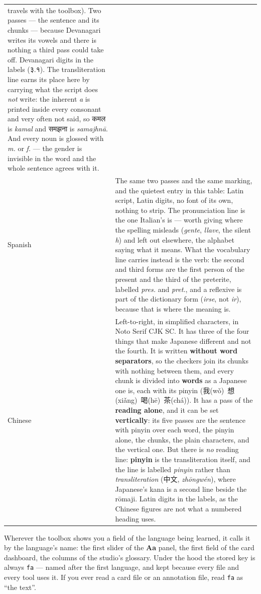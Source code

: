 \documentclass[11pt,oneside]{report}
\newcommand{\sw}[1]{\foreignlanguage{spanish}{\emph{#1}}}
\newcommand{\hw}[1]{\mbox{\foreignlanguage{hindi}{#1}}}
\newcommand{\cw}[1]{\mbox{\foreignlanguage{chinese}{#1}}}
\begin{document}
\begin{center}
\begin{longtable}{@{}p{}p{}@{}}
  travels with the toolbox). Two passes --- the sentence and its chunks ---
  because Devanagari writes its vowels and there is nothing a third pass
  could take off. Devanagari digits in the labels (\hw{३.१}). The
  transliteration line earns its place here by carrying what the script does
  \emph{not} write: the inherent \emph{a} is printed inside every consonant
  and very often not said, so \hw{कमल} is \emph{kamal} and \hw{समझना} is
  \emph{samajhn\=a}. And every noun is glossed with \emph{m.} or \emph{f.} ---
  the gender is invisible in the word and the whole sentence agrees with
  it. \\
\addlinespace
\textsf{Spanish} & The same two passes and the same marking, and the
  quietest entry in this table: Latin script, Latin digits, no font of its
  own, nothing to strip. The pronunciation line is the one Italian's is ---
  worth giving where the spelling misleads (\sw{gente}, \sw{llave}, the
  silent \sw{h}) and left out elsewhere, the alphabet saying what it means.
  What the vocabulary line carries instead is the verb: the second and third
  forms are the first person of the present and the third of the preterite,
  labelled \emph{pres.} and \emph{pret.}, and a reflexive is part of
  the dictionary form (\sw{irse}, not \sw{ir}), because that is where the
  meaning is. \\
\addlinespace
\textsf{Chinese} & Left-to-right, in simplified characters, in Noto Serif
  CJK SC. It has three of the four things that make Japanese different and
  not the fourth. It is written \textbf{without word separators}, so the
  checkers join its chunks with nothing between them, and every chunk is
  divided into \textbf{words} as a Japanese one is, each with its pinyin
  (\cw{我(wǒ) 想(xiǎng) 喝(hē) 茶(chá)}). It has a pass of the \textbf{reading
  alone}, and it can be set \textbf{vertically}: its five passes are the
  sentence with pinyin over each word, the pinyin alone, the chunks, the
  plain characters, and the vertical one. But there is \emph{no} reading
  line: \textbf{pinyin} is the transliteration
  itself, and the line is labelled \emph{pinyin} rather than
  \emph{transliteration} (\cw{中文}, \emph{zh\=ongw\'en}), where Japanese's
  kana is a second line beside the r\=omaji. Latin digits in the labels, as
  the Chinese figures are not what a numbered heading uses. \\
\bottomrule
\end{longtable}
\end{center}

Wherever the toolbox shows you a field of the language being learned, it
calls it by the language's name: the first slider of the \textbf{Aa} panel,
the first field of the card dashboard, the columns of the studio's glossary.
Under the hood the stored key is always \texttt{fa} --- named after the first
language, and kept because every file and every tool uses it. If you ever
read a card file or an annotation file, read \texttt{fa} as ``the text''.
\end{document}
